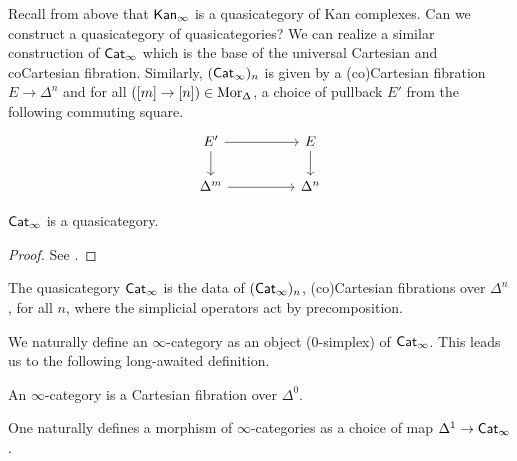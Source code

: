 Recall from above that $\mathsf{Kan}_{\infty}$ is a quasicategory of Kan complexes. Can we construct a quasicategory of quasicategories? We can realize a similar construction of $\Cat_{\infty}$ which is the base of the universal Cartesian and coCartesian fibration. Similarly, $(\mathsf{Cat}_{\infty})_{n}$ is given by a (co)Cartesian fibration $E\to \Delta^{n}$ and for all $([m]\to[n])\in\mathrm{Mor}_{\Updelta}$, a choice of pullback $E'$ from the following commuting square. 
$$%
\begin{tikzcd}
	{E'} && E \\
	{\Delta^{m}} && {\Delta^{n}}
	\arrow[from=2-1, to=2-3]
	\arrow[from=1-3, to=2-3]
	\arrow[from=1-1, to=1-3]
	\arrow[from=1-1, to=2-1]
\end{tikzcd}$$
\begin{theorem}\label{thm: cat infinity is a quasicategory}
    $\Cat_{\infty}$ is a quasicategory. 
\end{theorem}
\begin{proof}
    See \cite[Theorem 3.8]{Cisinski}. 
\end{proof}
\begin{definition}[$\Cat_{\infty}$]
    The quasicategory $\Cat_{\infty}$ is the data of $(\mathsf{Cat}_{\infty})_{n}$, (co)Cartesian fibrations over $\Delta^{n}$, for all $n$, where the simplicial operators act by precomposition. 
\end{definition}
We naturally define an $\infty$-category as an object (0-simplex) of $\Cat_{\infty}$. This leads us to the following long-awaited definition. 
\begin{definition}
    An $\infty$-category is a Cartesian fibration over $\Delta^{0}$. 
\end{definition}
One naturally defines a morphism of $\infty$-categories as a choice of map $\Delta^{1}\to\mathsf{Cat}_{\infty}$. 